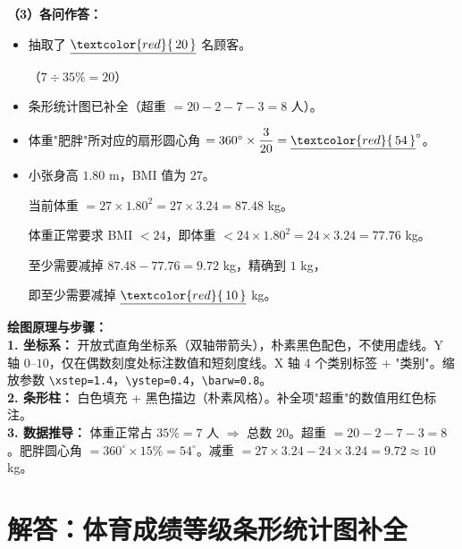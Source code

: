 \documentclass[12pt, a4paper]{ctexrep}
\begin{document}
\vspace{0.4cm}
\textbf{（3）各问作答：}

\begin{itemize}
    \item[\textbf{(1)}] 抽取了 $\underline{\textcolor{red}{\,20\,}}$ 名顾客。

    （$7 \div 35\% = 20$）

    \item[\textbf{(2)}] 条形统计图已补全（超重 $= 20 - 2 - 7 - 3 = 8$ 人）。

    \item[\textbf{(3)}] 体重"肥胖"所对应的扇形圆心角 $= 360^\circ \times \dfrac{3}{20} = \underline{\textcolor{red}{\,54\,}}^\circ$。

    \item[\textbf{(4)}] 小张身高 $1.80$ m，BMI 值为 $27$。

    当前体重 $= 27 \times 1.80^2 = 27 \times 3.24 = 87.48$ kg。

    体重正常要求 BMI $< 24$，即体重 $< 24 \times 1.80^2 = 24 \times 3.24 = 77.76$ kg。

    至少需要减掉 $87.48 - 77.76 = 9.72$ kg，精确到 $1$ kg，

    即至少需要减掉 $\underline{\textcolor{red}{\,10\,}}$ kg。
\end{itemize}

\vspace{0.4cm}
{\small\color{blue!70!black}
\textbf{绘图原理与步骤：}\\
\textbf{1. 坐标系：} 开放式直角坐标系（双轴带箭头），朴素黑色配色，不使用虚线。Y 轴 $0$--$10$，仅在偶数刻度处标注数值和短刻度线。X 轴 4 个类别标签 + "类别"。缩放参数 \texttt{\textbackslash{}xstep=1.4}，\texttt{\textbackslash{}ystep=0.4}，\texttt{\textbackslash{}barw=0.8}。\\
\textbf{2. 条形柱：} 白色填充 + 黑色描边（朴素风格）。补全项"超重"的数值用红色标注。\\
\textbf{3. 数据推导：} 体重正常占 $35\% = 7$ 人 $\Rightarrow$ 总数 $20$。超重 $= 20 - 2 - 7 - 3 = 8$。肥胖圆心角 $= 360^\circ \times 15\% = 54^\circ$。减重 $= 27 \times 3.24 - 24 \times 3.24 = 9.72 \approx 10$ kg。
}

\newpage

\section{解答：体育成绩等级条形统计图补全}
\end{document}
